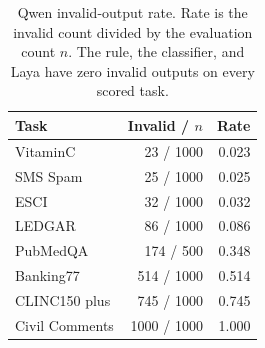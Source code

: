\begin{table}[htbp]
\centering
\small
\caption{Qwen invalid-output rate. Rate is the invalid count divided by the evaluation count \(n\). The rule, the classifier, and Laya have zero invalid outputs on every scored task.}
\label{tab:validity}
\begin{tabular}{@{}lrr@{}}
\toprule
Task & Invalid / \(n\) & Rate \\
\midrule
VitaminC & 23 / 1000 & 0.023 \\
SMS Spam & 25 / 1000 & 0.025 \\
ESCI & 32 / 1000 & 0.032 \\
LEDGAR & 86 / 1000 & 0.086 \\
PubMedQA & 174 / 500 & 0.348 \\
Banking77 & 514 / 1000 & 0.514 \\
CLINC150 plus & 745 / 1000 & 0.745 \\
Civil Comments & 1000 / 1000 & 1.000 \\
\bottomrule
\end{tabular}
\end{table}

